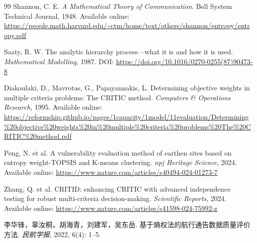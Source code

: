 \documentclass[UTF8,zihao=-4]{ctexart}
\begin{document}
\newpage
\begin{thebibliography}{99}
 Shannon, C. E. \textit{A Mathematical Theory of Communication}. Bell System Technical Journal, 1948. Available online: \url{https://people.math.harvard.edu/~ctm/home/text/others/shannon/entropy/entropy.pdf}

 Saaty, R. W. The analytic hierarchy process—what it is and how it is used. \textit{Mathematical Modelling}, 1987. DOI: \url{https://doi.org/10.1016/0270-0255(87)90473-8}

 Diakoulaki, D., Mavrotas, G., Papayannakis, L. Determining objective weights in multiple criteria problems: The CRITIC method. \textit{Computers \& Operations Research}, 1995. Available online: \url{https://reformship.github.io/pages/1capacity/1model/11evaluation/Determining%20objective%20weights%20in%20multiple%20criteria%20problems%20The%20CRITIC%20method.pdf}

 Peng, N. et al. A vulnerability evaluation method of earthen sites based on entropy weight-TOPSIS and K-means clustering. \textit{npj Heritage Science}, 2024. Available online: \url{https://www.nature.com/articles/s40494-024-01273-7}

 Zhang, Q. et al. CRITID: enhancing CRITIC with advanced independence testing for robust multi-criteria decision-making. \textit{Scientific Reports}, 2024. Available online: \url{https://www.nature.com/articles/s41598-024-75992-z}

 李华锋，辜汝桐，胡海青，刘建军，吴东岳. 基于熵权法的航行通告数据质量评价方法. \textit{民航学报}, 2022, 6(4): 1--5.
\end{thebibliography}
\end{document}
